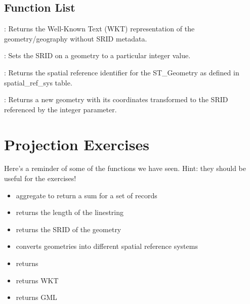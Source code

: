 \documentclass[a4paper,11pt,english]{sphinxmanual}
\begin{document}
\subsection{Function List}
\label{\detokenize{basic:id23}}
: Returns the Well-Known Text (WKT) representation of the geometry/geography without SRID metadata.

: Sets the SRID on a geometry to a particular integer value.

: Returns the spatial reference identifier for the ST\_Geometry as defined in spatial\_ref\_sys table.

: Returns a new geometry with its coordinates transformed to the SRID referenced by the integer parameter.


\section{Projection Exercises}
\label{\detokenize{basic:projection-exercises}}\label{\detokenize{basic:id25}}
Here’s a reminder of some of the functions we have seen.  Hint: they should be useful for the exercises!
\begin{itemize}
\item {} 
 aggregate to return a sum for a set of records

\item {} 
 returns the length of the linestring

\item {} 
 returns the SRID of the geometry

\item {} 
 converts geometries into different spatial reference systems

\item {} 
 returns 

\item {} 
 returns WKT 

\item {} 
 returns GML 

\end{itemize}
\end{document}
